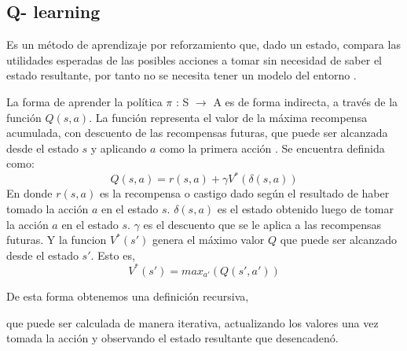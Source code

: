 \subsection{ Q- learning}

Es un método de aprendizaje por reforzamiento que, dado un estado, compara las utilidades esperadas de las posibles acciones a tomar sin necesidad de saber el estado resultante, por tanto no se necesita tener un modelo del entorno \cite{peterNorvig}.

La forma de aprender la política $\pi$ : S $\to$ A es de forma indirecta, a través de la función $Q(s,a)$. La función representa el valor de la máxima recompensa acumulada, con descuento de las recompensas futuras, que puede ser alcanzada desde el estado $s$ y aplicando $a$ como la primera acción \cite{Mitchell}. Se encuentra definida como:
\[Q(s,a) = r(s,a) + \gamma V^*(\delta(s,a))\] 
En donde $r(s,a)$ es la recompensa o castigo dado según el resultado de haber tomado la acción $a$ en el estado $s$. $\delta(s,a)$ es el estado obtenido luego de tomar la acción $a$ en el estado $s$. $\gamma$ es el descuento que se le aplica a las recompensas futuras. Y la funcion $V^*(s')$ genera el máximo valor $Q$ que puede ser alcanzado desde el estado $s'$. Esto es,
\[V^*(s')= max_{a'} (Q(s',a'))\] 

De esta forma obtenemos una definición recursiva,

que puede ser calculada de manera iterativa, actualizando los valores una vez tomada la acción y observando el estado resultante que desencadenó.  


